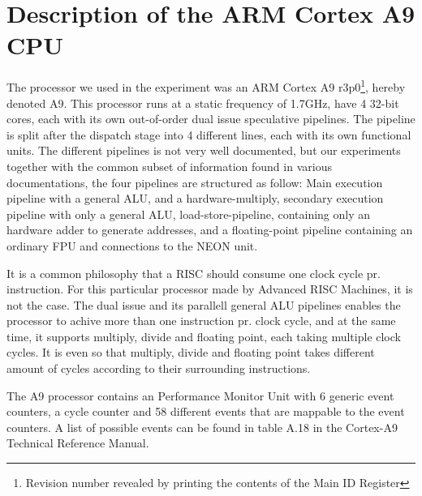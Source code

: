 \section{Description of the ARM Cortex A9 CPU}


The processor we used in the experiment was an ARM Cortex A9
r3p0\footnote{Revision number revealed by printing the contents of the Main ID
Register}, hereby denoted A9. This processor runs at a static frequency of
1.7GHz, have 4 32-bit cores, each with its own out-of-order dual issue
speculative pipelines\cite{armtech}. The pipeline is split after the dispatch
stage into 4 different lines, each with its own functional units. The different
pipelines is not very well documented, but our experiments together with the
common subset of information found in various
documentations\cite{armtech}\cite{7cpu}\cite{lotofdocs}, the four pipelines are
structured as follow: Main execution pipeline with a  general ALU, and a
hardware-multiply, secondary execution pipeline with only a general ALU,
load-store-pipeline, containing only an hardware adder to generate addresses,
and a floating-point pipeline containing an ordinary FPU and connections to the
NEON unit.

It is a common philosophy that a RISC should consume one clock cycle pr.
instruction\cite{unknown}.  For this particular processor made by Advanced RISC
Machines, it is not the case. The dual issue and its parallell general ALU
pipelines enables the processor to achive more than one instruction pr. clock
cycle, and at the same time, it supports multiply, divide and floating point,
each taking multiple clock cycles. It is even so that multiply, divide and
floating point takes different amount of cycles according to their surrounding
instructions.

The A9 processor contains an Performance Monitor Unit with 6 generic event
counters, a cycle counter and 58 different events that are mappable to the event
counters\cite{armtech}. A list of possible events can be found in table A.18 in
the Cortex-A9 Technical Reference Manual\cite{armtech}.


